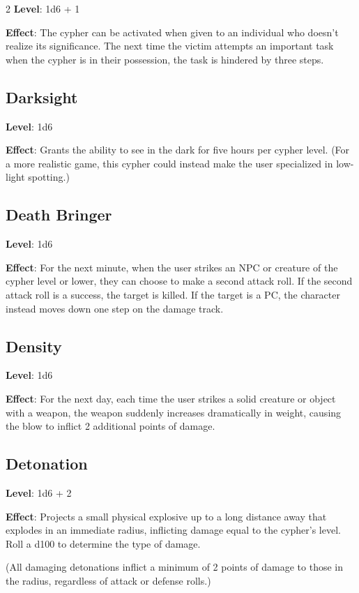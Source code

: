 \begin{multicols}{2}
\textbf{Level}: 1d6 + 1

\textbf{Effect}: The cypher can be activated when given to an individual who doesn’t realize its significance. The next time the victim attempts an important task when the cypher is in their possession, the task is hindered by three steps. 

\subsection{Darksight}

\textbf{Level}: 1d6

\textbf{Effect}: Grants the ability to see in the dark for five hours per cypher level. (For a more realistic game, this cypher could instead make the user specialized in low-light spotting.)

\subsection{Death Bringer}

\textbf{Level}: 1d6

\textbf{Effect}: For the next minute, when the user strikes an NPC or creature of the cypher level or lower, they can choose to make a second attack roll. If the second attack roll is a success, the target is killed. If the target is a PC, the character instead moves down one step on the damage track.

\subsection{Density}

\textbf{Level}: 1d6

\textbf{Effect}: For the next day, each time the user strikes a solid creature or object with a weapon, the weapon suddenly increases dramatically in weight, causing the blow to inflict 2 additional points of damage.

\subsection{Detonation}

\textbf{Level}: 1d6 + 2

\textbf{Effect}: Projects a small physical explosive up to a long distance away that explodes in an immediate radius, inflicting damage equal to the cypher’s level. Roll a d100 to determine the type of damage.

(All damaging detonations inflict a minimum of 2 points of damage to those in the radius, regardless of attack or defense rolls.)

\end{multicols}

